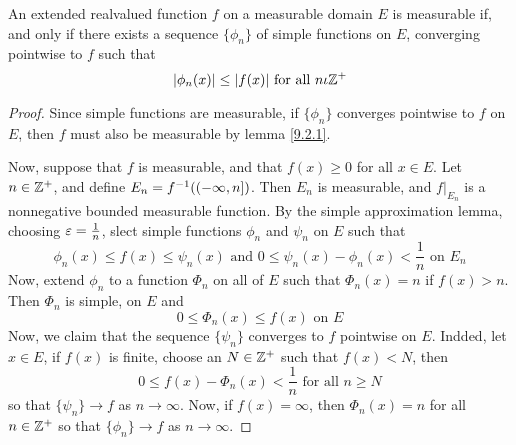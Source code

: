 \begin{theorem}\label{9.2.5}
    An extended realvalued function $f$ on a measurable domain $E$ is measurable
    if, and only if there exists a sequence  $\{\phi_n\}$ of simple functions on
    $E$, converging pointwise to  $f$ such that
    \begin{equation*}
        |\phi_n(x)| \leq |f(x)| \text{ for all } n \iota \mathbb{Z}^+
    \end{equation*}
\end{theorem}
\begin{proof}
    Since simple functions are measurable, if $\{\phi_n\}$ converges pointwise
    to $f$ on  $E$, then  $f$ must also be measurable by lemma \ref{9.2.1}.

    Now, suppose that $f$ is measurable, and that  $f(x) \geq 0$ for all $x \in
    E$. Let  $n \in \mathbb{Z}^+$, and define  $E_n=f^{-1}((-\infty,n])$. Then $E_n$ is
    measurable, and  $f|_{E_n}$ is a nonnegative bounded measurable function. By
    the simple approximation lemma, choosing $\varepsilon=\frac{1}{n}$, slect simple
    functions $\phi_n$ and  $\psi_n$ on  $E$ such that
    \begin{equation*}
        \phi_n(x) \leq f(x) \leq \psi_n(x) \text{ and }
        0 \leq \psi_n(x)-\phi_n(x)<\frac{1}{n} \text{ on } E_n
    \end{equation*}
    Now, extend $\phi_n$ to a function  $\Phi_n$ on all of  $E$ such that
    $\Phi_n(x)=n$ if $f(x)>n$. Then $\Phi_n$ is simple, on  $E$ and
    \begin{equation*}
        0 \leq \Phi_n(x) \leq f(x) \text{ on } E
    \end{equation*}
    Now, we claim that the sequence $\{\psi_n\}$ converges to $f$ pointwise on
    $E$. Indded, let  $x \in E$, if  $f(x)$ is finite, choose an $N \in \mathbb{Z}^+$
    such that  $f(x)<N$, then
    \begin{equation*}
        0 \leq f(x)-\Phi_n(x)<\frac{1}{n} \text{ for all } n \geq N
    \end{equation*}
    so that $\{\psi_n\} \xrightarrow{} f$ as $n \xrightarrow{} \infty$. Now, if
    $f(x)=\infty$, then $\Phi_n(x)=n$ for all $n \in \mathbb{Z}^+$ so that  $\{\phi_n\}
    \xrightarrow{} f$ as $n \xrightarrow{} \infty$.
\end{proof}
